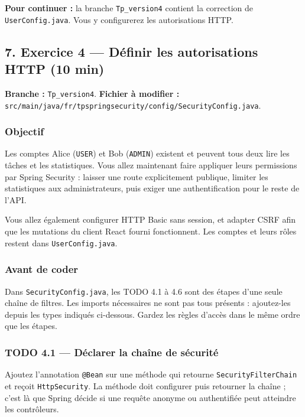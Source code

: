\documentclass[
  french,
  10pt,
  a4paper,
]{article}
\begin{document}
\textbf{Pour continuer :} la branche \texttt{Tp\_version4} contient la
correction de \texttt{UserConfig.java}. Vous y configurerez les
autorisations HTTP.

\subsection{7. Exercice 4 --- Définir les autorisations HTTP (10
min)}\label{exercice-4-duxe9finir-les-autorisations-http-10-min}

\textbf{Branche :} \texttt{Tp\_version4}. \textbf{Fichier à modifier :}
\texttt{src/main/java/fr/tpspringsecurity/config/SecurityConfig.java}.

\subsubsection{Objectif}\label{objectif-2}

Les comptes Alice (\texttt{USER}) et Bob (\texttt{ADMIN}) existent et
peuvent tous deux lire les tâches et les statistiques. Vous allez
maintenant faire appliquer leurs permissions par Spring Security :
laisser une route explicitement publique, limiter les statistiques aux
administrateurs, puis exiger une authentification pour le reste de
l'API.

Vous allez également configurer HTTP Basic sans session, et adapter CSRF
afin que les mutations du client React fourni fonctionnent. Les comptes
et leurs rôles restent dans \texttt{UserConfig.java}.

\subsubsection{Avant de coder}\label{avant-de-coder-1}

Dans \texttt{SecurityConfig.java}, les TODO 4.1 à 4.6 sont des étapes
d'une seule chaîne de filtres. Les imports nécessaires ne sont pas tous
présents : ajoutez-les depuis les types indiqués ci-dessous. Gardez les
règles d'accès dans le même ordre que les étapes.

\subsubsection{TODO 4.1 --- Déclarer la chaîne de
sécurité}\label{todo-4.1-duxe9clarer-la-chauxeene-de-suxe9curituxe9}

Ajoutez l'annotation \texttt{@Bean} sur une méthode qui retourne
\texttt{SecurityFilterChain} et reçoit \texttt{HttpSecurity}. La méthode
doit configurer puis retourner la chaîne ; c'est là que Spring décide si
une requête anonyme ou authentifiée peut atteindre les contrôleurs.
\end{document}
